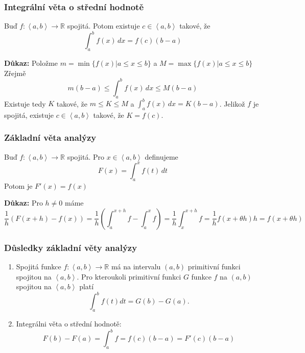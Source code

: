 \documentclass[../main.tex]{subfiles}
\begin{document}
\subsubsection{Integrální věta o střední hodnotě}
\hspace{1.2mm}
Buď $f: \left< a,b \right> \to \mathbb{R}$ spojitá. Potom existuje $c \in \left< a,b \right>$
takové, že
\[ \int_{a}^{b} f(x) \,dx = f(c)(b-a)\]

\vspace{5mm}
\noindent
\textbf{Důkaz:} Položme $m = \min \{ f(x)|a \leq x \leq b \}$ a $M = \max \{ f(x)|a \leq x \leq b \} $
Zřejmě
\[ m(b-a) \leq \int_{a}^{b} f(x) \,dx \leq M(b-a) \]
Existuje tedy $K$ takové, že $m \leq K \leq M$ a $\int_{a}^{b} f(x) \,dx = K(b-a)$.
Jelikož $f$ je spojitá, existuje $c \in \left< a,b \right>$ takové, že $K = f(c)$.

\subsubsection{Základní věta analýzy}
\hspace{1.2mm}
Buď $f: \left< a,b \right> \to \mathbb{R}$ spojitá. Pro $x \in \left< a,b \right>$ definujeme
\[ F(x) = \int_{a}^{x} f(t) \,dt \]
Potom je $F'(x) = f(x)$

\vspace{5mm}
\noindent
\textbf{Důkaz:}
Pro $h\neq 0$ máme
\[ \frac{1}{h}(F(x+h) - f(x)) =\frac{1}{h}\left( \int_{a}^{x+h} f - \int_{a}^{x} f \right) =
\frac{1}{h} \int_{x}^{x+h} f = \frac{1}{h}f(x + \theta h)h = f(x + \theta h) \]

\subsubsection{Důsledky základní věty analýzy}
\hspace{1.2mm}
\begin{enumerate}
    \item Spojitá funkce $f : \left<a,b\right> \rightarrow \mathbb{R}$ má na intervalu $(a,b)$ primitivní funkci spojitou na $\left<a,b\right>$.
          Pro kteroukoli primitivní funkci $G$ funkce $f$ na $(a,b)$ spojitou na $\left<a,b\right>$ platí
          \[\int^b_a f(t)dt = G(b) - G(a).\]
    \item Integrálni věta o střední hodnotě:
    \[F(b) - F(a) = \int^b_a f = f(c)(b-a) = F'(c)(b-a)\]
\end{enumerate}
\noindent
\end{document}
